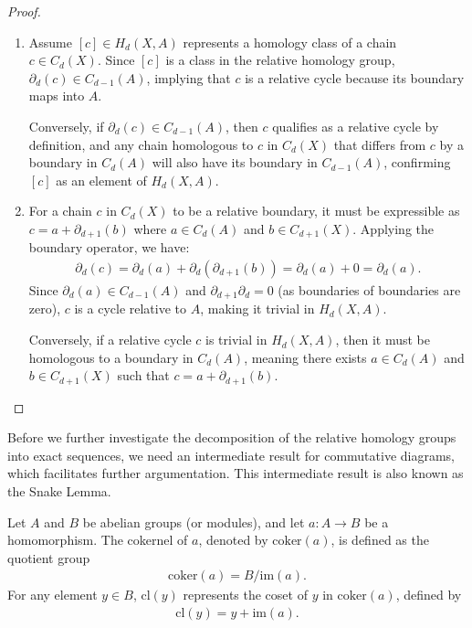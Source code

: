 \begin{proof}
	\begin{enumerate}
		\item Assume \([c] \in H_{d}(X, A)\) represents a homology class of a chain \( c \in C_{d}(X) \). Since \([c]\) is a class in the relative homology group, \( \partial_{d}(c) \in C_{d-1}(A) \), implying that \( c \) is a relative cycle because its boundary maps into \( A \).
		      		      		      
		      Conversely, if \( \partial_{d}(c) \in C_{d-1}(A) \), then \( c \) qualifies as a relative cycle by definition, and any chain homologous to \( c \) in \( C_{d}(X) \) that differs from \( c \) by a boundary in \( C_{d}(A) \) will also have its boundary in \( C_{d-1}(A) \), confirming \([c]\) as an element of \( H_{d}(X, A) \).
		      		      		      
		\item For a chain \( c \) in \( C_{d}(X) \) to be a relative boundary, it must be expressible as \( c = a + \partial_{d+1}(b) \) where \( a \in C_{d}(A) \) and \( b \in C_{d+1}(X) \). Applying the boundary operator, we have:
		      \begin{align}
		      	\partial_{d}(c) = \partial_{d}(a) + \partial_{d}(\partial_{d+1}(b)) = \partial_{d}(a) + 0 = \partial_{d}(a). 
		      \end{align}
		      Since \( \partial_{d}(a) \in C_{d-1}(A) \) and \( \partial_{d+1}\partial_{d} = 0 \) (as boundaries of boundaries are zero), \( c \) is a cycle relative to \( A \), making it trivial in \( H_{d}(X, A) \).
		      		      		      
		      Conversely, if a relative cycle \( c \) is trivial in \( H_{d}(X, A) \), then it must be homologous to a boundary in \( C_{d}(A) \), meaning there exists \( a \in C_{d}(A) \) and \( b \in C_{d+1}(X) \) such that \( c = a + \partial_{d+1}(b) \).
	\end{enumerate}
\end{proof}

Before we further investigate the decomposition of the relative homology groups into exact sequences, we need an intermediate result for commutative diagrams, which facilitates further argumentation. This intermediate result is also known as the Snake Lemma.

\begin{definition}
	Let \( A \) and \( B \) be abelian groups (or modules), and let \( a: A \to B \) be a homomorphism. The cokernel of \( a \), denoted by \( \text{coker}(a) \), is defined as the quotient group
	\begin{align}
		\text{coker}(a) = B / \text{im}(a). 
	\end{align}
	For any element \( y \in B \), \( \text{cl}(y) \) represents the coset of \( y \) in \( \text{coker}(a) \), defined by
	\begin{align}
		\text{cl}(y) = y + \text{im}(a). 
	\end{align}
\end{definition}

